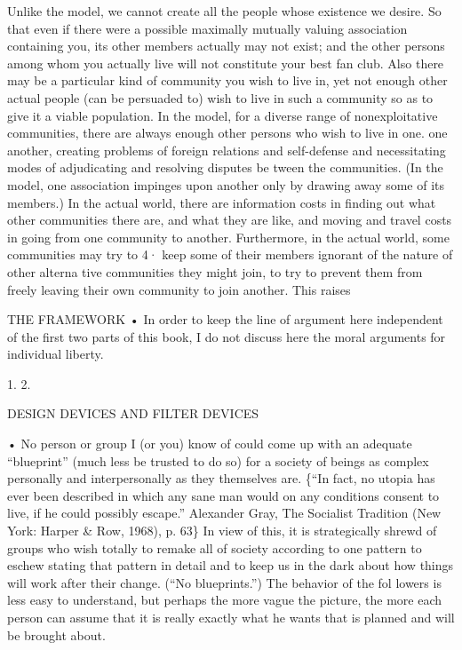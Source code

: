 \documentclass[11pt,openany]{book}
\begin{document}
{Unlike the model, we cannot create all the people whose existence we desire. So that even if there were a possible maximally mutually valuing association containing you, its other members actually may not exist; and the other persons among whom you actually live will not constitute your best fan club. Also there may be a particular kind of community you wish to live in, yet not enough other actual people (can be persuaded to) wish to live in such a community so as to give it a viable population. In the model, for a diverse range of nonexploitative communities, there are always enough other persons who wish to live in one. one another, creating problems of foreign relations and self-defense and necessitating modes of adjudicating and resolving disputes be tween the communities. (In the model, one association impinges upon another only by drawing away some of its members.) In the actual world, there are information costs in finding out what other communities there are, and what they are like, and moving and travel costs in going from one community to another. Furthermore, in the actual world, some communities may try to 4· keep some of their members ignorant of the nature of other alterna tive communities they might join, to try to prevent them from freely leaving their own community to join another. This raises\par

THE FRAMEWORK • In order to keep the line of argument here independent of the first two parts of this book, I do not discuss here the moral arguments for individual liberty.\par

1. 2.\par

DESIGN DEVICES AND FILTER DEVICES\par

• No person or group I (or you) know of could come up with an adequate ``blueprint'' (much less be trusted to do so) for a society of beings as complex personally and interpersonally as they themselves are. \{``In fact, no utopia has ever been described in which any sane man would on any conditions consent to live, if he could possibly escape.'' Alexander Gray, The Socialist Tradition (New York: Harper \& Row, 1968), p. 63\} In view of this, it is strategically shrewd of groups who wish totally to remake all of society according to one pattern to eschew stating that pattern in detail and to keep us in the dark about how things will work after their change. (``No blueprints.'') The behavior of the fol lowers is less easy to understand, but perhaps the more vague the picture, the more each person can assume that it is really exactly what he wants that is planned and will be brought about.\par

}
\end{document}
